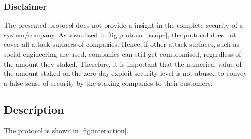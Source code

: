 \subsubsection{Disclaimer}
The presented protocol does not provide a insight in the complete security of a system/company. As visualised in \cref{fig:protocol_scope}, the protocol does not cover all attack surfaces of companies. Hence, if other attack surfaces, such as social engineering are used, companies can still get compromised, regardless of the amount they staked. Therefore, it is important that the numerical value of the amount staked on the zero-day exploit security level is not abused to convey a false sense of security by the staking companies to their customers.

\subsection{Description}
The protocol is shown in \cref{fig:interaction}.
